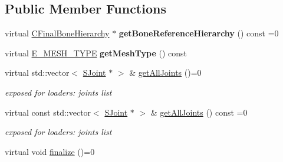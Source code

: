 \subsection*{Public Member Functions}
\begin{DoxyCompactItemize}
\item 
virtual \hyperlink{classirr_1_1scene_1_1CFinalBoneHierarchy}{C\+Final\+Bone\+Hierarchy} $\ast$ {\bfseries get\+Bone\+Reference\+Hierarchy} () const  =0\hypertarget{classirr_1_1scene_1_1ICPUSkinnedMesh_aa443e276729090325135e3de174a739e}{}\label{classirr_1_1scene_1_1ICPUSkinnedMesh_aa443e276729090325135e3de174a739e}

\item 
virtual \hyperlink{namespaceirr_1_1scene_aef0400177e5941293dff6640e800d11b}{E\+\_\+\+M\+E\+S\+H\+\_\+\+T\+Y\+PE} {\bfseries get\+Mesh\+Type} () const \hypertarget{classirr_1_1scene_1_1ICPUSkinnedMesh_a0f67b6b70b6ecd72ae9f8ab654c612b5}{}\label{classirr_1_1scene_1_1ICPUSkinnedMesh_a0f67b6b70b6ecd72ae9f8ab654c612b5}

\item 
virtual std\+::vector$<$ \hyperlink{classirr_1_1scene_1_1ICPUSkinnedMesh_1_1SJoint}{S\+Joint} $\ast$ $>$ \& \hyperlink{classirr_1_1scene_1_1ICPUSkinnedMesh_a432026219234bd5c98b1af820fd0103e}{get\+All\+Joints} ()=0\hypertarget{classirr_1_1scene_1_1ICPUSkinnedMesh_a432026219234bd5c98b1af820fd0103e}{}\label{classirr_1_1scene_1_1ICPUSkinnedMesh_a432026219234bd5c98b1af820fd0103e}

\begin{DoxyCompactList}\small\item\em exposed for loaders\+: joints list \end{DoxyCompactList}\item 
virtual const std\+::vector$<$ \hyperlink{classirr_1_1scene_1_1ICPUSkinnedMesh_1_1SJoint}{S\+Joint} $\ast$ $>$ \& \hyperlink{classirr_1_1scene_1_1ICPUSkinnedMesh_aef97dd768afe4cae2652bba7d3487d6c}{get\+All\+Joints} () const  =0\hypertarget{classirr_1_1scene_1_1ICPUSkinnedMesh_aef97dd768afe4cae2652bba7d3487d6c}{}\label{classirr_1_1scene_1_1ICPUSkinnedMesh_aef97dd768afe4cae2652bba7d3487d6c}

\begin{DoxyCompactList}\small\item\em exposed for loaders\+: joints list \end{DoxyCompactList}\item 
virtual void \hyperlink{classirr_1_1scene_1_1ICPUSkinnedMesh_a811b994c81509909cbb5c13d28ccb44f}{finalize} ()=0\hypertarget{classirr_1_1scene_1_1ICPUSkinnedMesh_a811b994c81509909cbb5c13d28ccb44f}{}\label{classirr_1_1scene_1_1ICPUSkinnedMesh_a811b994c81509909cbb5c13d28ccb44f}


\end{DoxyCompactItemize}
